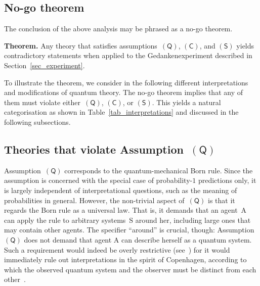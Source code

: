 \documentclass{article}
\theoremstyle{mystyle}
\theoremstyle{definition}
\newcommand*{\Agent}{\mathrm{A}}
\newcommand*{\System}{\mathrm{S}}
\newcommand*{\QT}{\mathsf{(Q)}}
\newcommand*{\SW}{\mathsf{(S)}}
\newcommand*{\SelfCons}{\mathsf{(C)}}
\begin{document}
\pagebreak[3]
 
\subsection{No-go theorem} \label{sec_nogo}

The conclusion of the above analysis may be phrased as a no-go theorem. 

\begin{emphbox}
  \noindent \textbf{Theorem.} 
 \noindent Any theory that satisfies assumptions~$\QT$, $\SelfCons$, and $\SW$ yields contradictory statements when applied to the Gedankenexperiment described in Section~\ref{sec_experiment}.
\end{emphbox}

To illustrate the theorem, we consider in the following different interpretations and modifications of quantum theory. The no-go theorem implies that any of them must violate either~$\QT$, $\SelfCons$, or $\SW$. This yields a natural categorisation as shown in Table~\ref{tab_interpretations} and discussed in the following subsections.  


\subsection{Theories that violate Assumption~$\QT$} \label{sec_QTviolation}

Assumption~$\QT$ corresponds to the quantum-mechanical Born rule. Since the assumption is concerned with the special case of probability-$1$ predictions only, it is largely independent of interpretational questions, such as the meaning of probabilities in general. However, the non-trivial aspect of~$\QT$ is that it regards the Born rule as a universal law. That is, it demands that an agent~$\Agent$ can apply the rule to arbitrary systems~$\System$ around her, including large ones that may contain other agents. The specifier ``around'' is crucial, though: Assumption~$\QT$ does not demand that agent $\Agent$ can describe herself as a quantum system. Such a requirement  would indeed be overly restrictive (see~\cite{DallaChiara77}) for it would immediately rule out  interpretations in the spirit of Copenhagen, according to which the observed quantum system and the observer must be distinct from each other~\cite{Heisenberg35,Bohr49}. 
\end{document}
